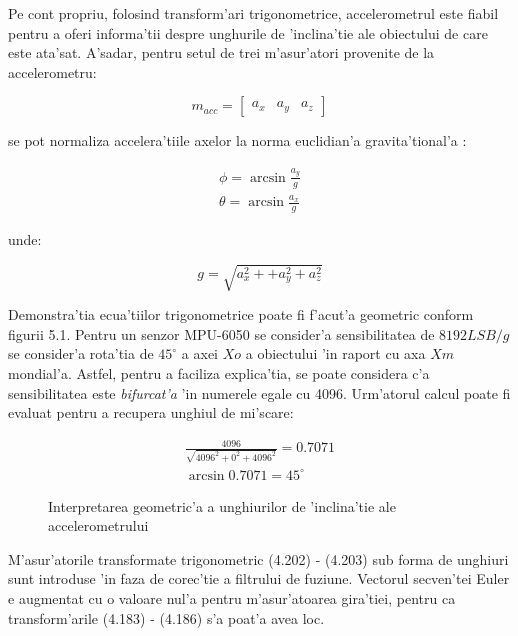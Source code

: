 \documentclass[12pt,a4paper,twoside]{report}
\begin{document}
\vspace{5px}

Pe cont propriu, folosind transform'ari trigonometrice, accelerometrul este fiabil pentru a oferi informa'tii despre unghurile de 'inclina'tie ale obiectului de care este ata'sat. A'sadar, pentru setul de trei m'asur'atori provenite de la accelerometru:

\begin{equation}
    m_{acc} = \begin{bmatrix}
    a_x & a_y & a_z
    \end{bmatrix} 
\end{equation}

se pot normaliza accelera'tiile axelor la norma euclidian'a gravita'tional'a \cite{accel}:

\begin{gather}
    \phi = \arcsin{\frac{a_y}{g}} \\ 
    \theta = \arcsin{\frac{a_x}{g}}
\end{gather}

unde:

\begin{equation}
    g = \sqrt{a^2_x + + a^2_y + a^2_z}
\end{equation}

Demonstra'tia ecua'tiilor trigonometrice poate fi f'acut'a geometric conform figurii 5.1. Pentru un senzor MPU-6050 se consider'a sensibilitatea de $8192 LSB/g$ \cite{MPU6050} se consider'a rota'tia de $45^\circ$ a axei $Xo$ a obiectului 'in raport cu axa $Xm$ mondial'a. Astfel, pentru a faciliza explica'tia, se poate considera c'a sensibilitatea este \textit{bifurcat'a} 'in numerele egale cu 4096. Urm'atorul calcul poate fi evaluat pentru a recupera unghiul de mi'scare:

\begin{gather}
    \frac{4096}{\sqrt{4096^2 + 0^2 + 4096^2}} = 0.7071 \\
    \arcsin{0.7071} = 45^\circ
\end{gather}

\begin{figure}[h]
\centering
 
 \caption{Interpretarea geometric'a a unghiurilor de 'inclina'tie ale accelerometrului}
\end{figure}

M'asur'atorile transformate trigonometric (4.202) - (4.203) sub forma de unghiuri sunt introduse 'in faza de corec'tie a filtrului de fuziune. Vectorul secven'tei Euler e augmentat cu o valoare nul'a pentru m'asur'atoarea gira'tiei, pentru ca transform'arile (4.183) - (4.186) s'a poat'a avea loc. 
\end{document}
